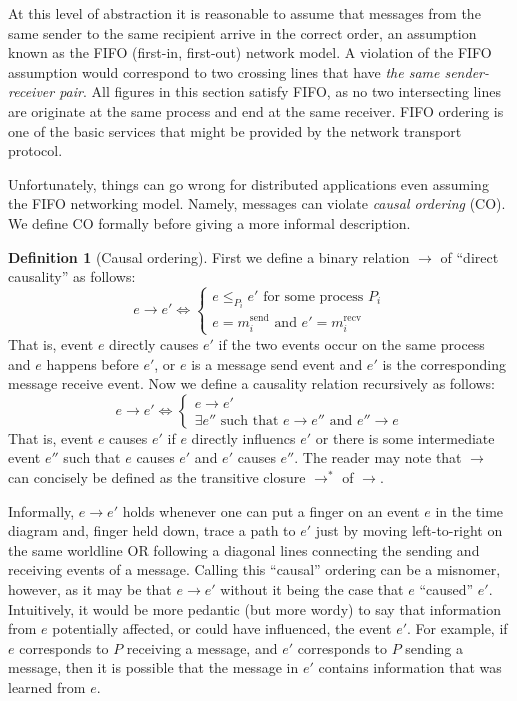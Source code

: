 \documentclass[]             %
{NASA}                       %
\theoremstyle{definition}
\newtheorem{definition}{Definition}[section]
\begin{document}
At this level of abstraction it is reasonable to assume that messages
from the same sender to the same recipient arrive in the correct
order, an assumption known as the FIFO (first-in, first-out) network
model. A violation of the FIFO assumption would correspond to two
crossing lines that have \emph{the same sender-receiver pair}. All
figures in this section satisfy FIFO, as no two intersecting lines are
originate at the same process and end at the same receiver. FIFO
ordering is one of the basic services that might be provided by the
network transport protocol.

Unfortunately, things can go wrong for distributed applications even
assuming the FIFO networking model. Namely, messages can violate
\emph{causal ordering} (CO). We define CO formally before giving a
more informal description.

\begin{definition}[Causal ordering]
  First we define a binary relation $\to$ of ``direct causality'' as follows:
  \[e \to e' \iff \begin{cases} e \leq_{P_i} e' \textrm{ for some process $P_i$} \\
    e = m_i^\textrm{send} \textrm{ and } e' = m_i^\textrm{recv}
  \end{cases}
  \]
  That is, event $e$ directly causes $e'$ if the two events occur on
  the same process and $e$ happens before $e'$, or $e$ is a message
  send event and $e'$ is the corresponding message receive event. Now
  we define a causality relation recursively as follows:
  \[e \to e' \iff \begin{cases} e \to e' \\
    \exists e'' \textrm{ such that } e \to e'' \textrm{ and } e'' \to e
  \end{cases}
  \]
  That is, event $e$ causes $e'$ if $e$ directly influencs $e'$ or
  there is some intermediate event $e''$ such that $e$ causes $e'$ and
  $e'$ causes $e''$. The reader may note that $\to$ can concisely be
  defined as the transitive closure $\to^\ast$ of $\to$.
\end{definition}

Informally, $e \to e'$ holds whenever one can put a finger on an event
$e$ in the time diagram and, finger held down, trace a path to $e'$
just by moving left-to-right on the same worldline OR following a
diagonal lines connecting the sending and receiving events of a
message. Calling this ``causal'' ordering can be a misnomer, however,
as it may be that $e \to e'$ without it being the case that $e$
``caused'' $e'$. Intuitively, it would be more pedantic (but more
wordy) to say that information from $e$ potentially affected, or could
have influenced, the event $e'$. For example, if $e$ corresponds to
$P$ receiving a message, and $e'$ corresponds to $P$ sending a
message, then it is possible that the message in $e'$ contains
information that was learned from $e$.
\end{document}

